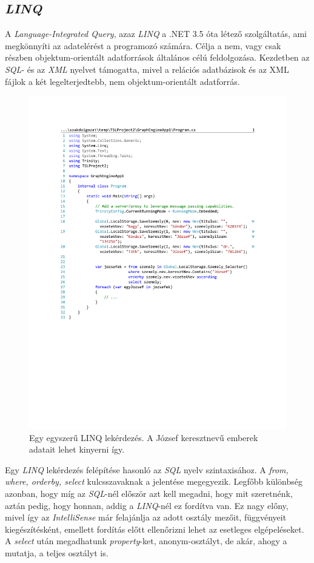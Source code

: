 \subsection{\emph{LINQ}}

A \emph{Language-Integrated Query}, azaz \emph{LINQ} a .NET 3.5 óta létező szolgáltatás, ami megkönnyíti az adatelérést a programozó számára. Célja a nem, vagy csak részben objektum-orientált adatforrások általános célú feldolgozása. Kezdetben az \emph{SQL}- és az \emph{XML} nyelvet támogatta, mivel a relációs adatbázisok és az XML fájlok a két legelterjedtebb, nem objektum-orientált adatforrás.

\begin{figure}[H]
	\centering
	\includegraphics[]{figures/JozsefekLINQ.pdf}
	\caption{Egy egyszerű LINQ lekérdezés. A József keresztnevű emberek adatait lehet kinyerni így.}
	\label{fig:LINQ}
\end{figure}

Egy \emph{LINQ} lekérdezés felépítése hasonló az \emph{SQL} nyelv szintaxisához. A \emph{from, where, orderby, select} kulcsszavaknak a jelentése megegyezik. Legfőbb különbség azonban, hogy míg az \emph{SQL}-nél először azt kell megadni, hogy mit szeretnénk, aztán pedig, hogy honnan, addig a \emph{LINQ}-nél ez fordítva van. Ez nagy előny, mivel így az \emph{IntelliSense} már felajánlja az adott osztály mezőit, függvényeit kiegészítésként, emellett fordítás előtt ellenőrizni lehet az esetleges elgépeléseket. A \emph{select} után megadhatunk \emph{property}-ket, anonym-osztályt, de akár, ahogy a  mutatja, a teljes osztályt is.

